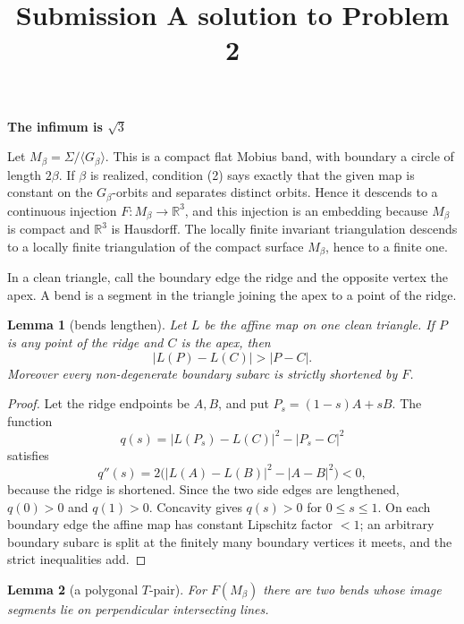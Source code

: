 \documentclass[12pt]{article}
\newtheorem{lemma}{Lemma}
\newcommand{\R}{\mathbb R}
\begin{document}
\title{Submission A solution to Problem 2}
\date{}
\maketitle

\begin{center}
{\bf The infimum is \(\sqrt3\)}
\end{center}

Let \(M_\beta=\Sigma/\langle G_\beta\rangle\).  This is a compact flat
Mobius band, with boundary a circle of length \(2\beta\).  If \(\beta\)
is realized, condition (2) says exactly that the given map is constant on
the \(G_\beta\)-orbits and separates distinct orbits.  Hence it descends
to a continuous injection \(F:M_\beta\to\R^3\), and this injection is an
embedding because \(M_\beta\) is compact and \(\R^3\) is Hausdorff.  The
locally finite invariant triangulation descends to a locally finite
triangulation of the compact surface \(M_\beta\), hence to a finite one.

In a clean triangle, call the boundary edge the ridge and the opposite
vertex the apex.  A bend is a segment in the triangle joining the apex to
a point of the ridge.

\begin{lemma}[bends lengthen]\label{lem:lengthen}
Let \(L\) be the affine map on one clean triangle.  If \(P\) is any point
of the ridge and \(C\) is the apex, then
\[
        |L(P)-L(C)|>|P-C|.
\]
Moreover every non-degenerate boundary subarc is strictly shortened by
\(F\).
\end{lemma}

\begin{proof}
Let the ridge endpoints be \(A,B\), and put \(P_s=(1-s)A+sB\).  The
function
\[
 q(s)= |L(P_s)-L(C)|^2-|P_s-C|^2
\]
satisfies
\[
 q''(s)=2\big(|L(A)-L(B)|^2-|A-B|^2\big)<0,
\]
because the ridge is shortened.  Since the two side edges are lengthened,
\(q(0)>0\) and \(q(1)>0\).  Concavity gives \(q(s)>0\) for
\(0\le s\le1\).  On each boundary edge the affine map has constant
Lipschitz factor \(<1\); an arbitrary boundary subarc is split at the
finitely many boundary vertices it meets, and the strict inequalities add.
\end{proof}

\begin{lemma}[a polygonal \(T\)-pair]\label{lem:T}
For \(F(M_\beta)\) there are two bends whose image segments lie on
perpendicular intersecting lines.
\end{lemma}
\end{document}
